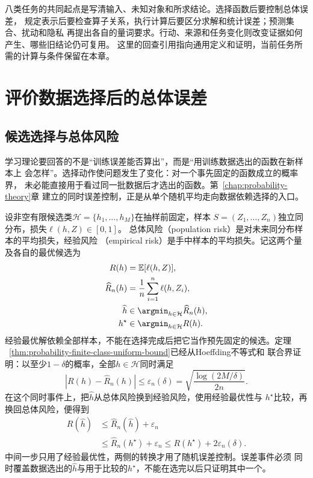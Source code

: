 八类任务的共同起点是写清输入、未知对象和所求结论。选择函数后要控制总体误差，
规定表示后要检查算子关系，执行计算后要区分求解和统计误差；预测集合、扰动和隐私
再提出各自的量词要求。行动、来源和任务变化则改变证据如何产生、哪些旧结论仍可复用。
这里的回查引用指向通用定义和证明，当前任务所需的计算与条件保留在本章。

\section{评价数据选择后的总体误差}
\label{sec:future-learning-theory-generalization}

\subsection{候选选择与总体风险}
\label{sec:future-selection-population-risk}

学习理论要回答的不是“训练误差能否算出”，而是“用训练数据选出的函数在新样本上
会怎样”。选择动作使问题发生了变化：对一个事先固定的函数成立的概率界，
未必能直接用于看过同一批数据后才选出的函数。第~\ref{chap:probability-theory}章
建立的同时误差控制，正是从单个随机平均走向数据依赖选择的入口。

设非空有限候选类$\mathcal{H}=\{h_1,\ldots,h_M\}$在抽样前固定，样本
$S=(Z_1,\ldots,Z_n)$独立同分布，损失$\ell(h,Z)\in[0,1]$。
总体风险（population risk）是对未来同分布样本的平均损失，经验风险
（empirical risk）是手中样本的平均损失。记这两个量及各自的最优候选为
\begin{align*}
  R(h)&=\mathbb{E}[\ell(h,Z)],\\
  \widehat{R}_n(h)
  &=
  \frac{1}{n}\sum_{i=1}^{n}\ell(h,Z_i),\\
  \widehat{h}
  &\in
  \argmin_{h\in\mathcal{H}}\widehat{R}_n(h),\\
  h^\star
  &\in
  \argmin_{h\in\mathcal{H}}R(h).
\end{align*}
经验最优解依赖全部样本，不能在选择完成后把它当作预先固定的候选。定理
~\ref{thm:probability-finite-class-uniform-bound}已经从Hoeffding不等式和
联合界证明：以至少$1-\delta$的概率，全部$h\in\mathcal H$同时满足
\[
  |R(h)-\widehat R_n(h)|
  \leq
  \varepsilon_n(\delta)
  =
  \sqrt{\frac{\log(2M/\delta)}{2n}}.
\]
在这个同时事件上，把$\widehat h$从总体风险换到经验风险，使用经验最优性与
$h^\star$比较，再换回总体风险，便得到
\begin{equation}
  \begin{aligned}
    R(\widehat h)
    &\leq \widehat R_n(\widehat h)+\varepsilon_n\\
    &\leq \widehat R_n(h^\star)+\varepsilon_n
    \leq R(h^\star)+2\varepsilon_n(\delta).
  \end{aligned}
  \label{eq:future-erm-risk-bound}
\end{equation}
中间一步只用了经验最优性，两侧的转换才用了随机误差控制。误差事件必须
同时覆盖数据选出的$\widehat h$与用于比较的$h^\star$，不能在选完以后只证明其中一个。

